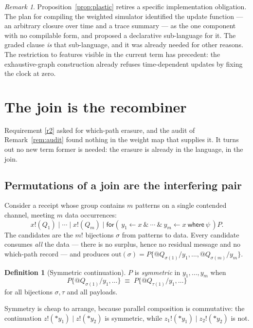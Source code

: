 \documentclass[11pt,a4paper]{article}
\theoremstyle{plain}
\theoremstyle{definition}
\newtheorem{definition}[theorem]{Definition}
\theoremstyle{remark}
\newtheorem{remark}[theorem]{Remark}
\newcommand{\scong}{\equiv}
\newcommand{\Out}{\mathrm{out}}
\begin{document}
\begin{remark}
Proposition~\ref{prop:plastic} retires a specific implementation obligation. The
plan for compiling the weighted simulator identified the update function --- an
arbitrary closure over time and a trace summary --- as the one component with no
compilable form, and proposed a declarative sub-language for it. The graded
clause \emph{is} that sub-language, and it was already needed for other reasons.
The restriction to features visible in the current term has precedent: the
exhaustive-graph construction already refuses time-dependent updates by fixing
the clock at zero.
\end{remark}

\section{The join is the recombiner}\label{sec:erasure}

Requirement \ref{r2} asked for which-path erasure, and the audit of
Remark~\ref{rem:audit} found nothing in the weight map that supplies it. It turns
out no new term former is needed: the erasure is already in the language, in the
join.

\subsection{Permutations of a join are the interfering pair}

Consider a receipt whose group contains $m$ patterns on a single contended
channel, meeting $m$ data occurrences:
\[
  x!(Q_1) \mid \cdots \mid x!(Q_m) \mid
  \textsf{for}(\,y_1 \leftarrow x\ \&\ \cdots\ \&\ y_m \leftarrow x
  \ \textsf{where}\ \psi\,)P .
\]
The candidates are the $m!$ bijections $\sigma$ from patterns to data. Every
candidate consumes \emph{all} the data --- there is no surplus, hence no residual
message and no which-path record --- and produces
$\Out(\sigma) = P\{@Q_{\sigma(1)}/y_1,\dots,@Q_{\sigma(m)}/y_m\}$.

\begin{definition}[Symmetric continuation]\label{def:sym}
$P$ is \emph{symmetric} in $y_1,\dots,y_m$ when
\[
  P\{@Q_{\sigma(1)}/y_1,\dots\} \;\scong\; P\{@Q_{\tau(1)}/y_1,\dots\}
\]
for all bijections $\sigma,\tau$ and all payloads.
\end{definition}

Symmetry is cheap to arrange, because parallel composition is commutative: the
continuation $z!(*y_1) \mid z!(*y_2)$ is symmetric, while
$z_1!(*y_1) \mid z_2!(*y_2)$ is not.
\end{document}
